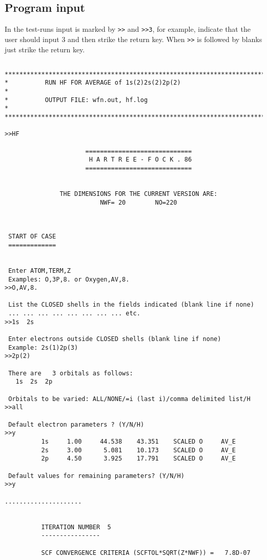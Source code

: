 \documentclass[fleqn,10pt]{book}
\begin{document}
\subsection*{Program input}
In the test-runs input is marked by \verb+>>+ and \verb+>>3+, for example, indicate that the user should input 3 and then strike the return key.
When \verb+>>+ is followed by blanks just strike the return key.
\begin{verbatim}

*******************************************************************************
*          RUN HF FOR AVERAGE of 1s(2)2s(2)2p(2)                              *
*          OUTPUT FILE: wfn.out, hf.log                                       *
*******************************************************************************

>>HF

                      =============================
                       H A R T R E E - F O C K . 86
                      =============================


               THE DIMENSIONS FOR THE CURRENT VERSION ARE:
                          NWF= 20        NO=220



 START OF CASE
 =============


 Enter ATOM,TERM,Z
 Examples: O,3P,8. or Oxygen,AV,8.
>>O,AV,8.

 List the CLOSED shells in the fields indicated (blank line if none)
 ... ... ... ... ... ... ... ... etc.
>>1s  2s

 Enter electrons outside CLOSED shells (blank line if none)
 Example: 2s(1)2p(3)
>>2p(2)

 There are   3 orbitals as follows:
   1s  2s  2p

 Orbitals to be varied: ALL/NONE/=i (last i)/comma delimited list/H
>>all

 Default electron parameters ? (Y/N/H) 
>>y
          1s     1.00     44.538    43.351    SCALED O     AV_E      
          2s     3.00      5.081    10.173    SCALED O     AV_E      
          2p     4.50      3.925    17.791    SCALED O     AV_E      

 Default values for remaining parameters? (Y/N/H) 
>>y

.....................


          ITERATION NUMBER  5
          ----------------

          SCF CONVERGENCE CRITERIA (SCFTOL*SQRT(Z*NWF)) =   7.8D-07



\end{verbatim}
\end{document}
